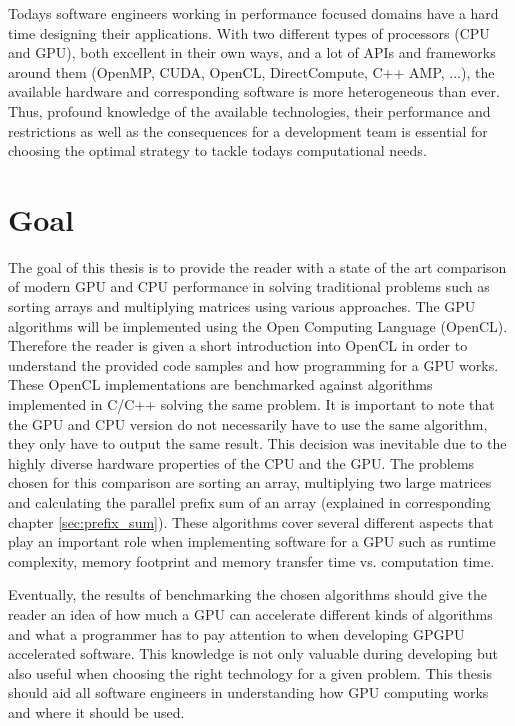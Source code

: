 Todays software engineers working in performance focused domains have a hard time designing their applications. With two different types of processors (CPU and GPU), both excellent in their own ways, and a lot of APIs and frameworks around them (OpenMP, CUDA, OpenCL, DirectCompute, C++ AMP, ...), the available hardware and corresponding software is more heterogeneous than ever. Thus, profound knowledge of the available technologies, their performance and restrictions as well as the consequences for a development team is essential for choosing the optimal strategy to tackle todays computational needs.

\section{Goal}
The goal of this thesis is to provide the reader with a state of the art comparison of modern GPU and CPU performance in solving traditional problems such as sorting arrays and multiplying matrices using various approaches.
The GPU algorithms will be implemented using the Open Computing Language (OpenCL). Therefore the reader is given a short introduction into OpenCL in order to understand the provided code samples and how programming for a GPU works. These OpenCL implementations are benchmarked against algorithms implemented in C/C++ solving the same problem. It is important to note that the GPU and CPU version do not necessarily have to use the same algorithm, they only have to output the same result. This decision was inevitable due to the highly diverse hardware properties of the CPU and the GPU.
The problems chosen for this comparison are sorting an array, multiplying two large matrices and calculating the parallel prefix sum of an array (explained in corresponding chapter \ref{sec:prefix_sum}). These algorithms cover several different aspects that play an important role when implementing software for a GPU such as runtime complexity, memory footprint and memory transfer time vs. computation time. 

Eventually, the results of benchmarking the chosen algorithms should give the reader an idea of how much a GPU can accelerate different kinds of algorithms and what a programmer has to pay attention to when developing GPGPU accelerated software. This knowledge is not only valuable during developing but also useful when choosing the right technology for a given problem. This thesis should aid all software engineers in understanding how GPU computing works and where it should be used.

